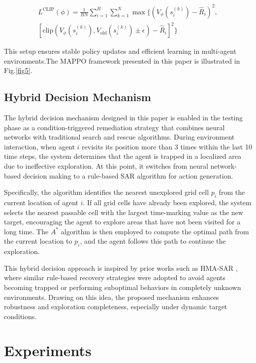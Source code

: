 \documentclass[lettersize,journal]{IEEEtran}
\begin{document}
\begin{multline}
L^{\text{CLIP}}(\phi) = \frac{1}{BN} \sum_{i=1}^{B} \sum_{k=1}^{N} 
\max \Big\{ 
\left( V_\phi(s^{(k)}_i) - \hat{R}_i \right)^2, \\
\left[ \text{clip} \left( V_\phi(s^{(k)}_i), V_{\text{old}}(s^{(k)}_i) \pm \epsilon \right) - \hat{R}_i \right]^2 
\Big\} \tag{17}
\end{multline}


This setup ensures stable policy updates and efficient learning in multi-agent environments.The MAPPO framework presented in this paper is illustrated in Fig.\ref{fig5}.

\subsection{Hybrid Decision Mechanism}
The hybrid decision mechanism designed in this paper is enabled in the testing phase as a condition-triggered remediation strategy that combines neural networks with traditional search and rescue algorithms. During environment interaction, when agent \( i \) revisits its position more than 3 times within the last 10 time steps, the system determines that the agent is trapped in a localized area due to ineffective exploration. At this point, it switches from neural network-based decision making to a rule-based SAR algorithm for action generation.

Specifically, the algorithm identifies the nearest unexplored grid cell \( p_i \) from the current location of agent \( i \). If all grid cells have already been explored, the system selects the nearest passable cell with the largest time-marking value as the new target, encouraging the agent to explore areas that have not been visited for a long time. The \( A^* \) algorithm is then employed to compute the optimal path from the current location to \( p_i \), and the agent follows this path to continue the exploration.

This hybrid decision approach is inspired by prior works such as HMA-SAR \cite{cao2024hma}, where similar rule-based recovery strategies were adopted to avoid agents becoming trapped or performing suboptimal behaviors in completely unknown environments. Drawing on this idea, the proposed mechanism enhances robustness and exploration completeness, especially under dynamic target conditions.

\section{Experiments}
\end{document}
